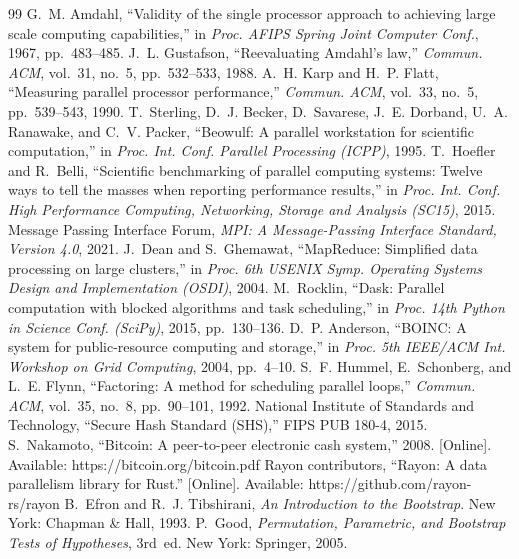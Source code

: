 \documentclass[conference,10pt]{IEEEtran}
\begin{document}
\begin{thebibliography}{99}
 G.~M. Amdahl, ``Validity of the single processor approach to achieving large scale computing capabilities,'' in \emph{Proc. AFIPS Spring Joint Computer Conf.}, 1967, pp.~483--485.
 J.~L. Gustafson, ``Reevaluating Amdahl's law,'' \emph{Commun. ACM}, vol.~31, no.~5, pp.~532--533, 1988.
 A.~H. Karp and H.~P. Flatt, ``Measuring parallel processor performance,'' \emph{Commun. ACM}, vol.~33, no.~5, pp.~539--543, 1990.
 T.~Sterling, D.~J. Becker, D.~Savarese, J.~E. Dorband, U.~A. Ranawake, and C.~V. Packer, ``Beowulf: A parallel workstation for scientific computation,'' in \emph{Proc. Int. Conf. Parallel Processing (ICPP)}, 1995.
 T.~Hoefler and R.~Belli, ``Scientific benchmarking of parallel computing systems: Twelve ways to tell the masses when reporting performance results,'' in \emph{Proc. Int. Conf. High Performance Computing, Networking, Storage and Analysis (SC15)}, 2015.
 Message Passing Interface Forum, \emph{MPI: A Message-Passing Interface Standard, Version 4.0}, 2021.
 J.~Dean and S.~Ghemawat, ``MapReduce: Simplified data processing on large clusters,'' in \emph{Proc. 6th USENIX Symp. Operating Systems Design and Implementation (OSDI)}, 2004.
 M.~Rocklin, ``Dask: Parallel computation with blocked algorithms and task scheduling,'' in \emph{Proc. 14th Python in Science Conf. (SciPy)}, 2015, pp.~130--136.
 D.~P. Anderson, ``BOINC: A system for public-resource computing and storage,'' in \emph{Proc. 5th IEEE/ACM Int. Workshop on Grid Computing}, 2004, pp.~4--10.
 S.~F. Hummel, E.~Schonberg, and L.~E. Flynn, ``Factoring: A method for scheduling parallel loops,'' \emph{Commun. ACM}, vol.~35, no.~8, pp.~90--101, 1992.
 National Institute of Standards and Technology, ``Secure Hash Standard (SHS),'' FIPS PUB 180-4, 2015.
 S.~Nakamoto, ``Bitcoin: A peer-to-peer electronic cash system,'' 2008. [Online]. Available: https://bitcoin.org/bitcoin.pdf
 Rayon contributors, ``Rayon: A data parallelism library for Rust.'' [Online]. Available: https://github.com/rayon-rs/rayon
 B.~Efron and R.~J. Tibshirani, \emph{An Introduction to the Bootstrap}. New York: Chapman \& Hall, 1993.
 P.~Good, \emph{Permutation, Parametric, and Bootstrap Tests of Hypotheses}, 3rd~ed. New York: Springer, 2005.
\end{thebibliography}
\end{document}
